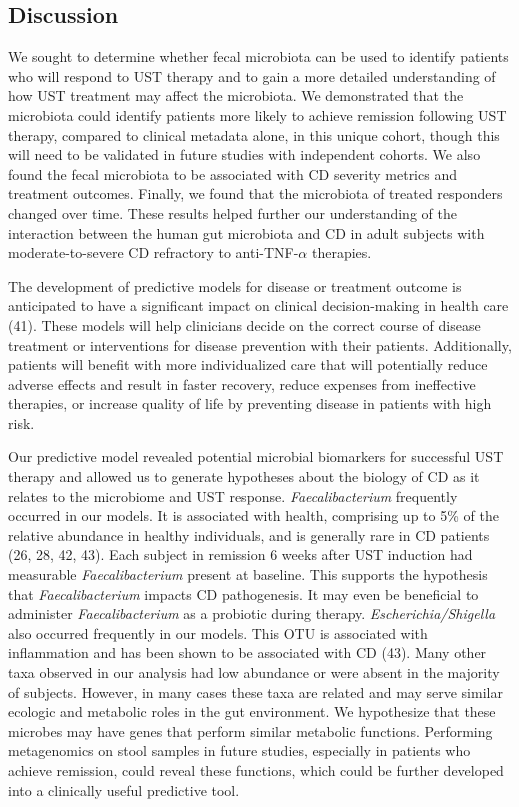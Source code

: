\documentclass[12pt,]{article}
\begin{document}
\subsection{Discussion}\label{discussion}

We sought to determine whether fecal microbiota can be used to identify
patients who will respond to UST therapy and to gain a more detailed
understanding of how UST treatment may affect the microbiota. We
demonstrated that the microbiota could identify patients more likely to
achieve remission following UST therapy, compared to clinical metadata
alone, in this unique cohort, though this will need to be validated in
future studies with independent cohorts. We also found the fecal
microbiota to be associated with CD severity metrics and treatment
outcomes. Finally, we found that the microbiota of treated responders
changed over time. These results helped further our understanding of the
interaction between the human gut microbiota and CD in adult subjects
with moderate-to-severe CD refractory to anti-TNF-\({\alpha}\)
therapies.

The development of predictive models for disease or treatment outcome is
anticipated to have a significant impact on clinical decision-making in
health care (41). These models will help clinicians decide on the
correct course of disease treatment or interventions for disease
prevention with their patients. Additionally, patients will benefit with
more individualized care that will potentially reduce adverse effects
and result in faster recovery, reduce expenses from ineffective
therapies, or increase quality of life by preventing disease in patients
with high risk.

Our predictive model revealed potential microbial biomarkers for
successful UST therapy and allowed us to generate hypotheses about the
biology of CD as it relates to the microbiome and UST response.
\emph{Faecalibacterium} frequently occurred in our models. It is
associated with health, comprising up to 5\% of the relative abundance
in healthy individuals, and is generally rare in CD patients (26, 28,
42, 43). Each subject in remission 6 weeks after UST induction had
measurable \emph{Faecalibacterium} present at baseline. This supports
the hypothesis that \emph{Faecalibacterium} impacts CD pathogenesis. It
may even be beneficial to administer \emph{Faecalibacterium} as a
probiotic during therapy. \emph{Escherichia/Shigella} also occurred
frequently in our models. This OTU is associated with inflammation and
has been shown to be associated with CD (43). Many other taxa observed
in our analysis had low abundance or were absent in the majority of
subjects. However, in many cases these taxa are related and may serve
similar ecologic and metabolic roles in the gut environment. We
hypothesize that these microbes may have genes that perform similar
metabolic functions. Performing metagenomics on stool samples in future
studies, especially in patients who achieve remission, could reveal
these functions, which could be further developed into a clinically
useful predictive tool.
\end{document}
